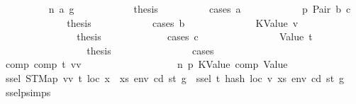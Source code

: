 \begin{isabellebody}
\ \ \ \ \ \ \ \ \isamarkupfalse%
\ {\isacharparenleft}{\kern0pt}n\ a\ g{\isacharprime}{\kern0pt}{\isacharparenright}{\kern0pt}\isanewline
\ \ \ \ \ \ \ \ \isamarkupfalse%
\ \isamarkupfalse%
\ {\isacharquery}{\kern0pt}thesis\isanewline
\ \ \ \ \ \ \ \ \isamarkupfalse%
\ {\isacharparenleft}{\kern0pt}cases\ a{\isacharparenright}{\kern0pt}\isanewline
\ \ \ \ \ \ \ \ \ \ \isamarkupfalse%
\ p{}{\isacharcolon}{\kern0pt}\ {\isacharparenleft}{\kern0pt}Pair\ b\ c{\isacharparenright}{\kern0pt}\isanewline
\ \ \ \ \ \ \ \ \ \ \isamarkupfalse%
\ \isamarkupfalse%
\ {\isacharquery}{\kern0pt}thesis\isanewline
\ \ \ \ \ \ \ \ \ \ \isamarkupfalse%
\ {\isacharparenleft}{\kern0pt}cases\ b{\isacharparenright}{\kern0pt}\isanewline
\ \ \ \ \ \ \ \ \ \ \ \ \isamarkupfalse%
\ {\isacharparenleft}{\kern0pt}KValue\ v{\isacharparenright}{\kern0pt}\isanewline
\ \ \ \ \ \ \ \ \ \ \ \ \isamarkupfalse%
\ \isamarkupfalse%
\ {\isacharquery}{\kern0pt}thesis\isanewline
\ \ \ \ \ \ \ \ \ \ \ \ \isamarkupfalse%
{\isacharparenleft}{\kern0pt}cases\ c{\isacharparenright}{\kern0pt}\isanewline
\ \ \ \ \ \ \ \ \ \ \ \ \ \ \isamarkupfalse%
\ {\isacharparenleft}{\kern0pt}Value\ t{\isacharprime}{\kern0pt}{\isacharprime}{\kern0pt}{\isacharparenright}{\kern0pt}\isanewline
\ \ \ \ \ \ \ \ \ \ \ \ \ \ \isamarkupfalse%
\ \isamarkupfalse%
\ {\isacharquery}{\kern0pt}thesis\isanewline
\ \ \ \ \ \ \ \ \ \ \ \ \ \ \isamarkupfalse%
\ {\isacharparenleft}{\kern0pt}cases{\isacharparenright}{\kern0pt}\isanewline
\ \ \ \ \ \ \ \ \ \ \ \ \ \ \ \ \isamarkupfalse%
\ comp{\isacharcolon}{\kern0pt}\ {\isachardoublequoteopen}comp\ t{\isacharprime}{\kern0pt}{\isacharprime}{\kern0pt}\ vv{\isachardoublequoteclose}\isanewline
\ \ \ \ \ \ \ \ \ \ \ \ \ \ \ \ \isamarkupfalse%
\ {}\ n\ p{}\ KValue\ comp\ Value\ \isamarkupfalse%
\ {\isachardoublequoteopen}ssel\ {\isacharparenleft}{\kern0pt}STMap\ vv\ t{\isacharparenright}{\kern0pt}\ loc\ {\isacharparenleft}{\kern0pt}x\ {\isacharhash}{\kern0pt}\ xs{\isacharparenright}{\kern0pt}\ env\ cd\ st\ g\ {\isacharequal}{\kern0pt}\ ssel\ t\ {\isacharparenleft}{\kern0pt}hash\ loc\ v{\isacharparenright}{\kern0pt}\ xs\ env\ cd\ st\ g{\isacharprime}{\kern0pt}{\isachardoublequoteclose}\ \isamarkupfalse%
\ ssel{\isachardot}{\kern0pt}psimps{\isacharparenleft}{\kern0pt}{}{\isacharparenright}{\kern0pt}\ \isamarkupfalse%

\end{isabellebody}
